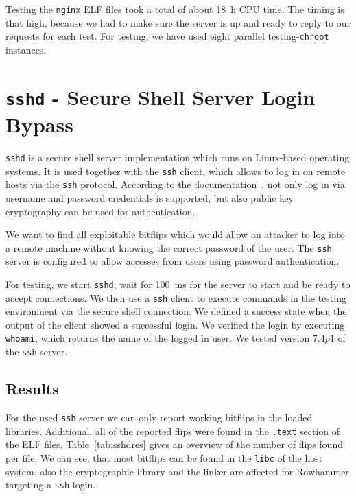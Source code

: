 Testing the \texttt{nginx} ELF files took a total of about \SI{18}{\hour} CPU
time. The timing is that high, because we had to make sure the server is up and
ready to reply to our requests for each test. For testing, we have used eight
parallel testing-\texttt{chroot} instances.

\section{\texttt{sshd} - Secure Shell Server Login Bypass}

\texttt{sshd} is a secure shell server implementation which runs on Linux-based
operating systems. It is used together with the \texttt{ssh} client, which
allows to log in on remote hosts via the \texttt{ssh} protocol. According to the
documentation~\cite{sshman}, not only log in via username and password
credentials is supported, but also public key cryptography can be used for
authentication.

We want to find all exploitable bitflips which would allow an attacker to log
into a remote machine without knowing the correct password of the user. The
\texttt{ssh} server is configured to allow accesses from users using password
authentication.

For testing, we start \texttt{sshd}, wait for \SI{100}{\milli\second} for the
server to start and be ready to accept connections. We then use a \texttt{ssh}
client to execute commands in the testing environment via the secure shell
connection. We defined a success state when the output of the client showed a
successful login. We verified the login by executing \texttt{whoami}, which
returns the name of the logged in user. We tested version $7.4p1$ of the
\texttt{ssh} server.

\subsection{Results}

For the used \texttt{ssh} server we can only report working bitflips in the
loaded libraries. Additional, all of the reported flips were found in the
\texttt{.text} section of the ELF files. Table~\ref{tab:sshdres} gives an
overview of the number of flips found per file. We can see, that most bitflips
can be found in the \texttt{libc} of the host system, also the cryptographic
library and the linker are affected for Rowhammer targeting a \texttt{ssh}
login.

